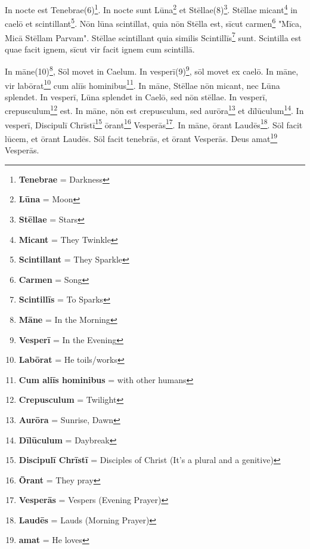 In nocte est Tenebrae(6)\footnote{\textbf{Tenebrae} = Darkness}. In nocte sunt Lūna\footnote{\textbf{Lūna} = Moon} et Stēllae(8)\footnote{\textbf{Stēllae} = Stars}. Stēllae micant\footnote{\textbf{Micant} = They Twinkle} in caelō et scintillant\footnote{\textbf{Scintillant} = They Sparkle}. Nōn lūna scintillat, quia nōn Stēlla est, sīcut carmen\footnote{\textbf{Carmen} = Song} "Mīca, Micā Stēllam Parvam". Stēllae scintillant quia similis Scintillīs\footnote{\textbf{Scintillīs} = To Sparks} sunt. Scintilla est quae facit ignem, sīcut vir facit ignem cum scintillā. \par
In māne(10)\footnote{\textbf{Māne} = In the Morning}, Sōl movet in Caelum. In vesperī(9)\footnote{\textbf{Vesperī} = In the Evening}, sōl movet ex caelō. In māne, vir labōrat\footnote{\textbf{Labōrat} = He toils/works} cum aliīs hominibus\footnote{\textbf{Cum aliīs hominibus} = with other humans}. In māne, Stēllae nōn micant, nec Lūna splendet. In vesperī, Lūna splendet in Caelō, sed nōn stēllae. In vesperī, crepusculum\footnote{\textbf{Crepusculum} = Twilight} est. In māne, nōn est crepusculum, sed aurōra\footnote{\textbf{Aurōra} = Sunrise, Dawn} et dīlūculum\footnote{\textbf{Dīlūculum} = Daybreak}. In vesperī, Discipulī Chrīstī\footnote{\textbf{Discipulī Chrīstī} = Disciples of Christ (It's a plural and a genitive)} ōrant\footnote{\textbf{Ōrant} = They pray} Vesperās\footnote{\textbf{Vesperās} = Vespers (Evening Prayer)}. In māne, ōrant Laudēs\footnote{\textbf{Laudēs} = Lauds (Morning Prayer)}. Sōl facit lūcem, et ōrant Laudēs. Sōl facit tenebrās, et ōrant Vesperās. Deus amat\footnote{\textbf{amat} = He loves} Vesperās.\par